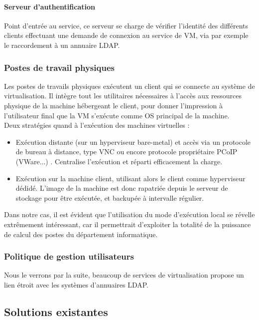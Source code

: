 \paragraph{Serveur d'authentification} 
Point d'entrée au service, ce serveur se charge de vérifier l'identité des différents clients effectuant une demande de connexion au service de VM, via par exemple le raccordement à un annuaire LDAP.

\subsubsection{Postes de travail physiques}

Les postes de travails physiques exécutent un client qui se connecte au système de virtualisation. Il intègre tout les utilitaires nécessaires à l'accès aux ressources physique de la machine hébergeant le client, pour donner l'impression à l'utilisateur final que la VM s'exécute comme OS principal de la machine.\\
Deux stratégies quand à l'exécution des machines virtuelles :\\
\begin{itemize}
\item Exécution distante (sur un hyperviseur bare-metal) et accès via un protocole de bureau à distance, type VNC ou encore protocole propriétaire PCoIP (VWare...) . Centralise l'exécution et réparti efficacement la charge.
\item Exécution sur la machine client, utilisant alors le client comme hyperviseur dédidé. L'image de la machine est donc rapatriée depuis le serveur de stockage pour être exécutée, et backupée à intervalle régulier.
\end{itemize}

Dans notre cas, il est évident que l'utilisation du mode d'exécution local se révelle extrêmement intéressant, car il permettrait d'exploiter la totalité de la puissance de calcul des postes du département informatique.

\subsubsection{Politique de gestion utilisateurs}

Nous le verrons par la suite, beaucoup de services de virtualisation propose un lien étroit avec les systèmes d'annuaires LDAP.

\subsection{Solutions existantes}

